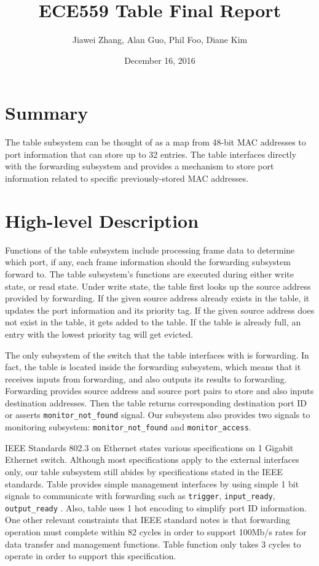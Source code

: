 \documentclass{article}
\title{ECE559 Table Final Report}
\author{Jiawei Zhang, Alan Guo, Phil Foo, Diane Kim }
\date{December 16, 2016}
\begin{document}
\maketitle

\section{Summary}

The table subsystem can be thought of as a map from 48-bit MAC addresses to port information that can store up to 32 entries. The table interfaces directly with the forwarding subsystem and provides a mechanism to store port information related to specific previously-stored MAC addresses.

\section{High-level Description}

Functions of the table subsystem include processing frame data to determine which port, if any, each frame information should the forwarding subsystem forward to. The table subsystem’s functions are executed during either write state, or read state. Under write state, the table first looks up the source address provided by forwarding. If the given source address already exists in the table, it updates the port information and its priority tag. If the given source address does not exist in the table, it gets added to the table. If the table is already full, an entry with the lowest priority tag will get evicted.

The only subsystem of the switch that the table interfaces with is forwarding. In fact, the table is located inside the forwarding subsystem, which means that it receives inputs from forwarding, and also outputs its results to forwarding. Forwarding provides source address and source port pairs to store and also inputs destination addresses. Then the table returns corresponding destination port ID or asserts \texttt{monitor\_not\_found} signal. Our subsystem also provides two signals to monitoring subsystem: \texttt{monitor\_not\_found} and \texttt{monitor\_access}.

IEEE Standards 802.3 on Ethernet states various specifications on 1 Gigabit Ethernet switch. Although most specifications apply to the external interfaces only, our table subsystem still abides by specifications stated in the IEEE standards. Table provides simple management interfaces by using simple 1 bit signals to communicate with forwarding such as \texttt{trigger}, \texttt{input\_ready}, \texttt{output\_ready} . Also, table uses 1 hot encoding to simplify port ID information. One other relevant constraints that IEEE standard notes is that forwarding operation must complete within 82 cycles in order to support 100Mb/s rates for data transfer and management functions. Table function only takes 3 cycles to operate in order to support this specification.  
\end{document}

